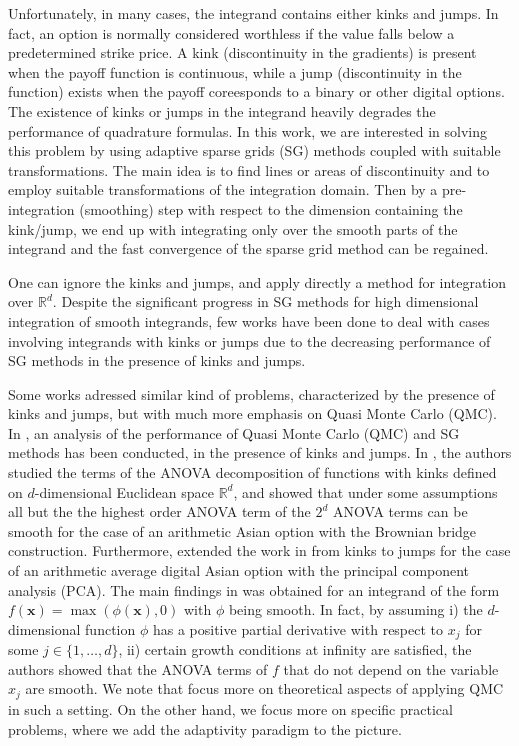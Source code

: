 \documentclass[11pt]{article}
\newcommand{\rset}{\mathbb{R}}
\begin{document}
Unfortunately, in many cases, the  integrand contains either kinks and jumps. In fact, an option is normally considered worthless if the value falls below a predetermined strike price.  A kink  (discontinuity in the gradients) is present when the payoff function is  continuous, while a jump (discontinuity in the function)  exists when the payoff coreesponds to a binary or other digital options. The existence of kinks or jumps in the integrand  heavily degrades
the performance of quadrature formulas.  In this work, we are interested in solving this problem  by using adaptive  sparse grids (SG) methods coupled with suitable transformations. The main idea is to find lines or areas of discontinuity and to employ suitable transformations of the integration domain. Then  by a pre-integration (smoothing) step with respect to the dimension containing the kink/jump,  we end up with integrating  only over the smooth parts of the integrand and the fast convergence of the sparse grid method can be regained.


One can ignore the kinks and jumps, and apply directly a method for integration over $\rset^d$.  Despite the  significant progress in SG methods \cite{bungartz2004sparse} for high dimensional integration  of  smooth integrands, few works have been done to deal with  cases involving integrands with kinks or jumps due to the decreasing performance of SG methods in the presence of kinks and jumps. 


Some works \cite{griebel2013smoothing,bayersmoothing, griebel2017note,griewank2017high,xiao2018conditional} adressed similar kind of problems, characterized by the presence of kinks and jumps,  but with much more emphasis on Quasi Monte Carlo (QMC). In \cite{griebel2013smoothing, griebel2017note,griewank2017high}, an  analysis of the performance of  Quasi Monte Carlo (QMC) and SG methods has been conducted, in the presence of kinks and jumps.  In \cite{griebel2013smoothing,griebel2017note}, the authors studied the terms of the ANOVA decomposition of functions with kinks defined on $d$-dimensional Euclidean space $\rset^d$, and showed   that under some assumptions all but the the highest order ANOVA term  of the $2^d$ ANOVA terms can be smooth for the case of an arithmetic Asian option with the Brownian bridge construction. Furthermore, \cite{griewank2017high} extended the work in \cite{griebel2013smoothing,griebel2017note} from kinks
to jumps for  the case of an arithmetic average digital Asian option with the principal component analysis (PCA). The main findings in \cite{griebel2013smoothing,griebel2017note} was obtained  for an  integrand  of the form $f(\mathbf{x}) = \max(\phi(\mathbf{x}), 0)$ with $\phi$ being smooth. In fact, by assuming  i) the $d$-dimensional function $\phi$ has a positive partial derivative with respect to $x_j$ for some $j \in \{1,\dots,d\}$, ii) certain growth conditions at infinity are satisfied, the authors showed that the ANOVA terms of $f$ that do not depend on the variable $x_j$ are smooth.   We note that \cite{griebel2013smoothing,griebel2017note,griewank2017high} focus  more on  theoretical aspects of applying QMC in such a setting. On the other hand, we focus more on  specific practical problems, where we add the adaptivity paradigm to the picture.
\end{document}
